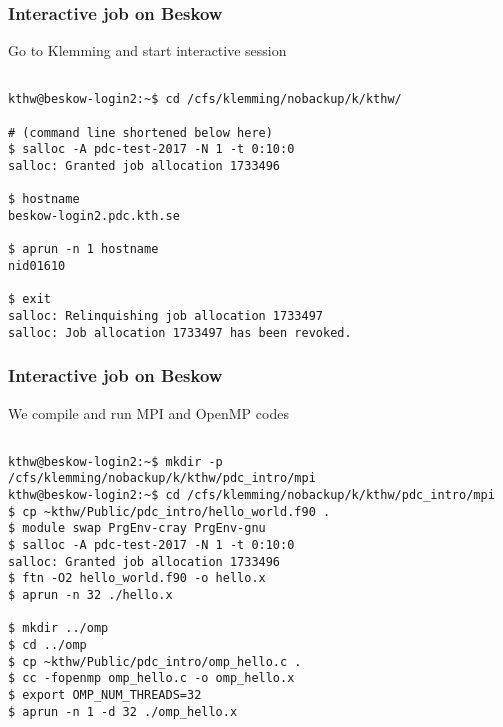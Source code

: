 \begin{frame}[fragile]
  \frametitle{Interactive job on Beskow}
  \begin{alertblock}{Go to Klemming and start interactive session}
    \verbatimfont{\footnotesize}
    \begin{verbatim}

kthw@beskow-login2:~$ cd /cfs/klemming/nobackup/k/kthw/

# (command line shortened below here)
$ salloc -A pdc-test-2017 -N 1 -t 0:10:0
salloc: Granted job allocation 1733496

$ hostname
beskow-login2.pdc.kth.se

$ aprun -n 1 hostname
nid01610

$ exit
salloc: Relinquishing job allocation 1733497
salloc: Job allocation 1733497 has been revoked.

 \end{verbatim}
\end{alertblock}



\end{frame}



\begin{frame}[fragile]
  \frametitle{Interactive job on Beskow}
  \begin{alertblock}{We compile and run MPI and OpenMP codes}
    \verbatimfont{\footnotesize}
    \begin{verbatim}

kthw@beskow-login2:~$ mkdir -p /cfs/klemming/nobackup/k/kthw/pdc_intro/mpi
kthw@beskow-login2:~$ cd /cfs/klemming/nobackup/k/kthw/pdc_intro/mpi
$ cp ~kthw/Public/pdc_intro/hello_world.f90 .
$ module swap PrgEnv-cray PrgEnv-gnu
$ salloc -A pdc-test-2017 -N 1 -t 0:10:0
salloc: Granted job allocation 1733496
$ ftn -O2 hello_world.f90 -o hello.x
$ aprun -n 32 ./hello.x

$ mkdir ../omp
$ cd ../omp
$ cp ~kthw/Public/pdc_intro/omp_hello.c .
$ cc -fopenmp omp_hello.c -o omp_hello.x
$ export OMP_NUM_THREADS=32
$ aprun -n 1 -d 32 ./omp_hello.x

 \end{verbatim}
\end{alertblock}



\end{frame}




